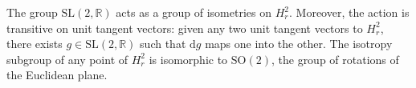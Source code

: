 The group $\mathrm{SL}(2, \mathbb{R})$ acts as a group of isometries on $H_r^2$. Moreover, the action is transitive on unit tangent vectors: given any two unit tangent vectors to $H_r^2$, there exists $g \in \mathrm{SL}(2, \mathbb{R})$ such that $\mathrm{d}g$ maps one into the other. The isotropy subgroup of any point of $H_r^2$ is isomorphic to $\mathrm{SO}(2)$, the group of rotations of the Euclidean plane.
